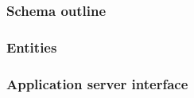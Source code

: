 \subsubsection{Schema outline}

\subsubsection{Entities}

\subsubsection{Application server interface}




 




%
%
%
%
%
%




